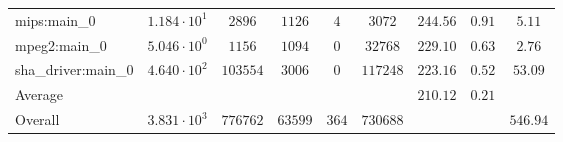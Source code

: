 \begin{tabular}{|l|c|c|c|c|c|c|c|c|}
mips:main\_0            & $ 1.184 \cdot 10^{1}  $ & $ 2896   $ & $ 1126  $ & $ 4   $ & $ 3072   $ & $ 244.56      $ & $ 0.91    $ & $ 5.11    $ \\
mpeg2:main\_0           & $ 5.046 \cdot 10^{0}  $ & $ 1156   $ & $ 1094  $ & $ 0   $ & $ 32768  $ & $ 229.10      $ & $ 0.63    $ & $ 2.76    $ \\
sha\_driver:main\_0     & $ 4.640 \cdot 10^{2}  $ & $ 103554 $ & $ 3006  $ & $ 0   $ & $ 117248 $ & $ 223.16      $ & $ 0.52    $ & $ 53.09   $ \\
\hline
Average                 & $                     $ & $        $ & $       $ & $     $ & $        $ & $ 210.12      $ & $ 0.21    $ & $         $ \\
\hline
Overall                 & $ 3.831 \cdot 10^{3}  $ & $ 776762 $ & $ 63599 $ & $ 364 $ & $ 730688 $ & $             $ & $         $ & $ 546.94  $ \\
\hline
\end{tabular}
